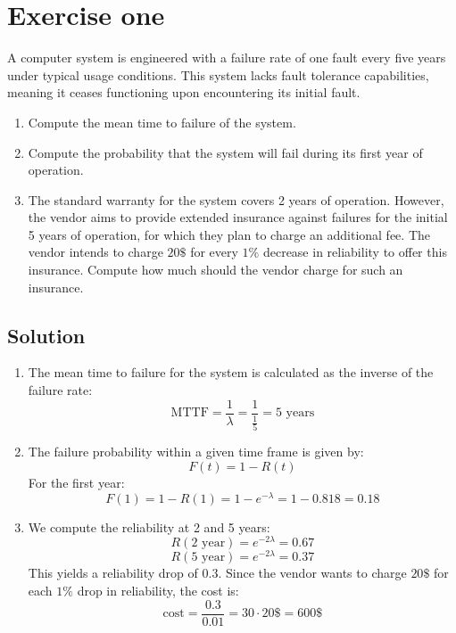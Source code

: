 \section{Exercise one}

A computer system is engineered with a failure rate of one fault every five years under typical usage conditions. 
This system lacks fault tolerance capabilities, meaning it ceases functioning upon encountering its initial fault.
\begin{enumerate}
    \item Compute the mean time to failure of the system.
    \item Compute the probability that the system will fail during its first year of operation. 
    \item The standard warranty for the system covers 2 years of operation. 
        However, the vendor aims to provide extended insurance against failures for the initial 5 years of operation, for which they plan to charge an additional fee.  
        The vendor intends to charge $20\$$ for every $1\%$ decrease in reliability to offer this insurance. 
        Compute how much should the vendor charge for such an insurance.
\end{enumerate}

\subsection*{Solution}
\begin{enumerate}
    \item The mean time to failure for the system is calculated as the inverse of the failure rate:
        \[\text{MTTF}=\dfrac{1}{\lambda}=\dfrac{1}{\frac{1}{5}}=5\text{ years}\]
    \item The failure probability within a given time frame is given by:
        \[F(t)=1-R(t)\]
        For the first year:
        \[F(1)=1-R(1)=1-e^{-\lambda}=1-0.818=0.18\]
    \item We compute the reliability at 2 and 5 years:
        \[R(2\text{ year})=e^{-2\lambda}=0.67\]
        \[R(5\text{ year})=e^{-2\lambda}=0.37\]
        This yields a reliability drop of $0.3$. 
        Since the vendor wants to charge $20\$$ for each $1\%$ drop in reliability, the cost is:
        \[\text{cost}=\dfrac{0.3}{0.01}=30\cdot 20\$=600\$\]
\end{enumerate}